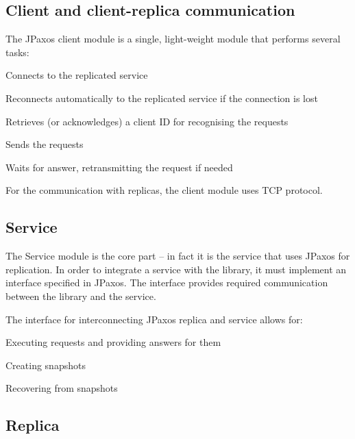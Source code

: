 \subsection{Client and client-replica communication}

The JPaxos client module is a single, light-weight module that performs several tasks:

\begin{tightList}[\setlength{\topsep}{0pt} \setlength{\partopsep}{0pt}]
 \item[\textbullet] Connects to the replicated service
 \item[\textbullet] Reconnects automatically to the replicated service if the connection is lost
 \item[\textbullet] Retrieves (or acknowledges) a client ID for recognising the requests
 \item[\textbullet] Sends the requests
 \item[\textbullet] Waits for answer, retransmitting the request if needed
\end{tightList}

\noindent For the communication with replicas, the client module uses TCP protocol.

\subsection{Service}


The Service module is the core part -- in fact it is the service that uses JPaxos for replication.
In order to integrate a service with the library, it must implement an interface specified in JPaxos. The interface provides required communication between the library and the service.

The interface for interconnecting JPaxos replica and service allows for:
\begin{tightList}
 \item[\textbullet] Executing requests and providing answers for them
 \item[\textbullet] Creating snapshots
 \item[\textbullet] Recovering from snapshots
\end{tightList}

\subsection{Replica}

